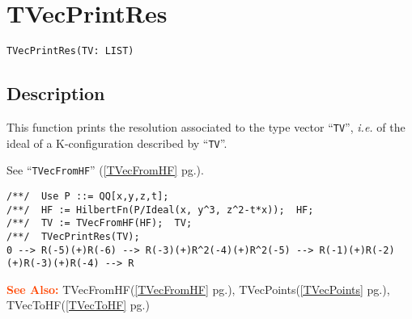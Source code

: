 \documentclass[a4paper]{mybook}
\newenvironment{command}{}{} %
\newcommand\SeeAlso{\par\textcolor{OrangeRed}{\textbf{\large See Also: }}}
\begin{document}
\section{TVecPrintRes}
\label{TVecPrintRes}
\begin{command} %


\begin{Verbatim}[label=syntax, rulecolor=\color{MidnightBlue},
frame=single]
TVecPrintRes(TV: LIST)
\end{Verbatim}


\subsection*{Description}

This function prints the resolution associated to the type vector ``\verb&TV&'',
\textit{i.e.} of the ideal of a K-configuration described by ``\verb&TV&''.
\par 
See ``\verb&TVecFromHF&'' (\ref{TVecFromHF} pg.\pageref{TVecFromHF}).
\begin{Verbatim}[label=example, rulecolor=\color{PineGreen}, frame=single]
/**/  Use P ::= QQ[x,y,z,t];
/**/  HF := HilbertFn(P/Ideal(x, y^3, z^2-t*x));  HF;
/**/  TV := TVecFromHF(HF);  TV;
/**/  TVecPrintRes(TV);
0 --> R(-5)(+)R(-6) --> R(-3)(+)R^2(-4)(+)R^2(-5) --> R(-1)(+)R(-2)(+)R(-3)(+)R(-4) --> R
\end{Verbatim}


\SeeAlso %
  TVecFromHF(\ref{TVecFromHF} pg.\pageref{TVecFromHF}), 
    TVecPoints(\ref{TVecPoints} pg.\pageref{TVecPoints}), 
    TVecToHF(\ref{TVecToHF} pg.\pageref{TVecToHF})
\end{command} %
\end{document}

